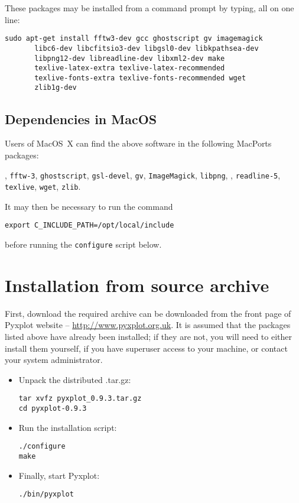 \noindent These packages may be installed from a command prompt by typing, all on one line:

\begin{verbatim}
sudo apt-get install fftw3-dev gcc ghostscript gv imagemagick
       libc6-dev libcfitsio3-dev libgsl0-dev libkpathsea-dev
       libpng12-dev libreadline-dev libxml2-dev make
       texlive-latex-extra texlive-latex-recommended
       texlive-fonts-extra texlive-fonts-recommended wget
       zlib1g-dev
\end{verbatim}

\subsection{Dependencies in MacOS}

Users of MacOS~X can find the above software in the following MacPorts packages:

\vspace{2mm}
, {\tt fftw-3}, {\tt ghostscript}, {\tt gsl-devel}, {\tt gv}, {\tt ImageMagick}, {\tt libpng},\newline
{}, {\tt readline-5}, {\tt texlive}, {\tt wget}, {\tt zlib}.
\vspace{2mm}

It may then be necessary to run the command
\begin{verbatim}
export C_INCLUDE_PATH=/opt/local/include
\end{verbatim}
before running the {\tt configure} script below.

\section{Installation from source archive}

First, download the required archive can be downloaded from the front page of
Pyxplot website -- \url{http://www.pyxplot.org.uk}. It is assumed that the
packages listed above have already been installed; if they are not, you will
need to either install them yourself, if you have superuser access to your
machine, or contact your system administrator.

\begin{itemize}
\item Unpack the distributed .tar.gz:

\begin{verbatim}
tar xvfz pyxplot_0.9.3.tar.gz
cd pyxplot-0.9.3
\end{verbatim}

\item Run the installation script:

\begin{verbatim}
./configure
make
\end{verbatim}

\item Finally, start Pyxplot:

\begin{verbatim}
./bin/pyxplot
\end{verbatim}

\end{itemize}

